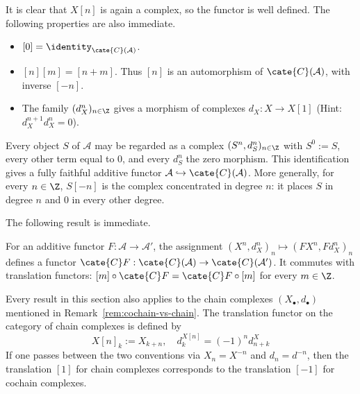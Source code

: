 It is clear that $X[n]$ is again a complex, so the functor is well defined.
The following properties are also immediate.
\begin{itemize}
	\item $[0]=\identity_{\cate{C}(\mathcal{A})}$.
	\item $[n][m]=[n+m]$. Thus $[n]$ is an automorphism of
	$\cate{C}(\mathcal{A})$, with inverse $[-n]$.
	\item The family $(d_X^n)_{n\in\Z}$ gives a morphism of complexes
	$d_X:X\to X[1]$ (Hint: $d_X^{n+1}d_X^n=0$).
\end{itemize}

\begin{convention}\label{con:concentrated-cplx}
	Every object $S$ of $\mathcal{A}$ may be regarded as a complex
	$(S^n,d_S^n)_{n\in\Z}$ with $S^0:=S$, every other term equal to $0$, and
	every $d_S^n$ the zero morphism. This identification gives a fully faithful
	additive functor $\mathcal{A}\hookrightarrow\cate{C}(\mathcal{A})$. More
	generally, for every $n\in\Z$, $S[-n]$ is the complex concentrated in
	degree $n$: it places $S$ in degree $n$ and $0$ in every other degree.
\end{convention}

The following result is immediate.

\begin{proposition}\label{prop:CA-functoriality}
	For an additive functor $F:\mathcal{A}\to\mathcal{A}'$, the assignment
	$(X^n,d_X^n)_n\mapsto(FX^n,Fd_X^n)_n$ defines a functor
	$\cate{C}F:\cate{C}(\mathcal{A})\to\cate{C}(\mathcal{A}')$. It commutes
	with translation functors:
	$[m]\circ\cate{C}F=\cate{C}F\circ[m]$ for every $m\in\Z$.
\end{proposition}

\begin{remark}\label{rem:chain-cplx-translation}
	\index[sym1]{[n]}
	Every result in this section also applies to the chain complexes
	$(X_\bullet,d_\bullet)$ mentioned in Remark~\ref{rem:cochain-vs-chain}.
	The translation functor on the category of chain complexes is defined by
	\[ X[n]_k:=X_{k+n},\quad d^{X[n]}_k=(-1)^nd^X_{n+k} \]
	If one passes between the two conventions via $X_n=X^{-n}$ and
	$d_n=d^{-n}$, then the translation $[1]$ for chain complexes corresponds
	to the translation $[-1]$ for cochain complexes.
\end{remark}
